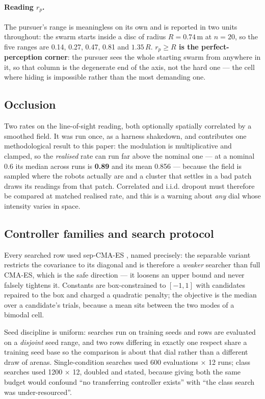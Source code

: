 \documentclass[11pt,a4paper]{article}
\begin{document}
\paragraph{Reading $r_p$.} The pursuer's range is meaningless on its own and is
reported in two units throughout: the swarm starts inside a disc of radius
$R = 0.74$\,m at $n = 20$, so the five ranges are 0.14, 0.27, 0.47, 0.81 and
$1.35\,R$. \textbf{$r_p \ge R$ is the perfect-perception corner}: the pursuer sees
the whole starting swarm from anywhere in it, so that column is the degenerate end
of the axis, not the hard one --- the cell where hiding is impossible rather than
the most demanding one.

\subsection{Occlusion}

Two rates on the line-of-sight reading, both optionally spatially correlated by
a smoothed field. It was run once, as a harness shakedown, and contributes one
methodological result to this paper: the modulation is multiplicative and
clamped, so the \emph{realised} rate can run far above the nominal
one --- at a nominal 0.6 its median across runs is \textbf{0.89} and its mean
0.856 --- because the field is
sampled where the robots actually are and a cluster that settles in a bad patch
draws its readings from that patch. Correlated and i.i.d. dropout must therefore
be compared at matched realised rate, and this is a warning about \emph{any}
dial whose intensity varies in space.

\subsection{Controller families and search protocol}

Every searched row used sep-CMA-ES \citep{ros2008}, named precisely: the
separable variant restricts the covariance to its diagonal and is therefore a
\emph{weaker} searcher than full CMA-ES, which is the safe direction --- it
loosens an upper bound and never falsely tightens it. Constants are
box-constrained to $[-1,1]$ with candidates repaired to the box and charged a
quadratic penalty; the objective is the median over a candidate's trials, because
a mean sits between the two modes of a bimodal cell.

Seed discipline is uniform: searches run on training seeds and rows are evaluated
on a \emph{disjoint} seed range, and two rows differing in exactly one respect
share a training seed base so the comparison is about that dial rather than a
different draw of arenas. Single-condition searches used 600 evaluations
$\times$ 12 runs; class searches used 1200 $\times$ 12, doubled and stated,
because giving both the same budget would confound ``no transferring controller
exists'' with ``the class search was under-resourced''.
\end{document}
